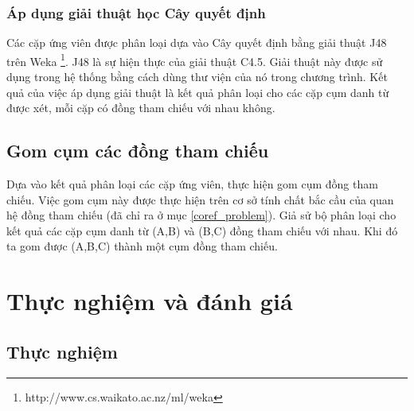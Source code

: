 \documentclass[12pt]{report}
\begin{document}
			\subsection*{Áp dụng giải thuật học Cây quyết định}
				\par Các cặp ứng viên được phân loại dựa vào Cây quyết định bằng giải thuật J48 trên Weka \footnote{http://www.cs.waikato.ac.nz/ml/weka}. J48 là sự hiện thực của giải thuật C4.5. Giải thuật này được sử dụng trong hệ thống bằng cách dùng thư viện của nó trong chương trình. Kết quả của việc áp dụng giải thuật là kết quả phân loại cho các cặp cụm danh từ được xét, mỗi cặp có đồng tham chiếu với nhau không.
		\section{Gom cụm các đồng tham chiếu}	
			\par Dựa vào kết quả phân loại các cặp ứng viên, thực hiện gom cụm đồng tham chiếu. Việc gom cụm này được thực hiện trên cơ sở tính chất bắc cầu của quan hệ đồng tham chiếu (đã chỉ ra ở mục \ref{coref_problem}). Giả sử bộ phân loại cho kết quả các cặp cụm danh từ (A,B) và (B,C) đồng tham chiếu với nhau. Khi đó ta gom được (A,B,C) thành một cụm đồng tham chiếu.	

	\chapter{Thực nghiệm và đánh giá}						
		\section{Thực nghiệm}
\end{document}
